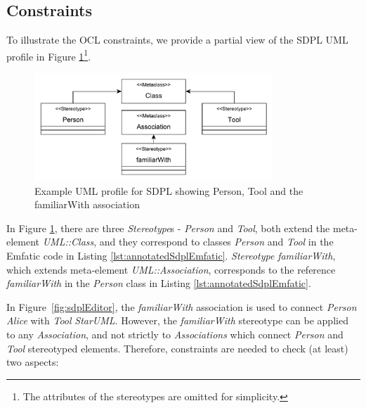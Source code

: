 \subsection{Constraints}
\label{sec:constraints}

To illustrate the OCL constraints, we provide a partial view of the SDPL UML profile in Figure \ref{fig:sample_profile}\footnote{The attributes of the stereotypes are omitted for simplicity.}.

\begin{figure}[ht!]
	\centering
	\includegraphics[width=0.8\textwidth]{diagrams/example_profile}
	\caption[]{Example UML profile for SDPL showing Person, Tool and the familiarWith association}
	\label{fig:sample_profile}
\end{figure}

In Figure \ref{fig:sample_profile}, there are three \emph{Stereotype}s - 
\emph{Person} and \emph{Tool}, both extend the meta-element \emph{UML::Class}, 
and they correspond to classes \emph{Person} and \emph{Tool} in the Emfatic 
code in Listing \ref{lst:annotatedSdplEmfatic}. \emph{Stereotype} 
\emph{familiarWith}, which extends meta-element \emph{UML::Association}, 
corresponds to the reference \emph{familiarWith} in the \emph{Person} class in 
Listing \ref{lst:annotatedSdplEmfatic}.

%

In Figure~\ref{fig:sdplEditor}, the \textit{familiarWith} association is used 
to connect \textit{Person} \emph{Alice} with \textit{Tool} \emph{StarUML}. However, 
the \emph{familiarWith} stereotype can be applied to any \emph{Association}, 
and not strictly to \emph{Associations} which connect \emph{Person} and 
\emph{Tool} stereotyped elements. Therefore, constraints are needed to check 
(at least) two aspects:

